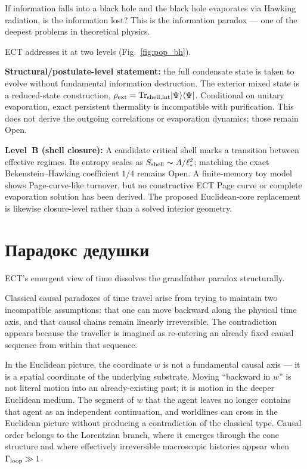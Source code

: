 \documentclass[11pt,a4paper]{article}
\begin{document}
If information falls into a black hole and the black hole evaporates via Hawking radiation, is the information lost? This is the information paradox --- one of the deepest problems in theoretical physics.

ECT addresses it at two levels (Fig.~\ref{fig:pop_bh}).

\textbf{Structural/postulate-level statement:} the full condensate state is taken to evolve without fundamental information destruction. The exterior mixed state is a reduced-state construction, $\rho_{\rm ext}={\rm Tr}_{\rm shell,int}|\Psi\rangle\langle\Psi|$.  Conditional on unitary evaporation, exact persistent thermality is incompatible with purification.  This does not derive the outgoing correlations or evaporation dynamics; those remain Open.

\textbf{Level~B (shell closure):} A candidate critical shell marks a transition between effective regimes.  Its entropy scales as $S_{\rm shell}\sim A/\ell_*^2$; matching the exact Bekenstein--Hawking coefficient $1/4$ remains Open.  A finite-memory toy model shows Page-curve-like turnover, but no constructive ECT Page curve or complete evaporation solution has been derived.  The proposed Euclidean-core replacement is likewise closure-level rather than a solved interior geometry.


\section{Парадокс дедушки}

ECT's emergent view of time dissolves the grandfather paradox structurally.

Classical causal paradoxes of time travel arise from trying to maintain two incompatible assumptions: that one can move backward along the physical time axis, and that causal chains remain linearly irreversible. The contradiction appears because the traveller is imagined as re-entering an already fixed causal sequence from within that sequence.

In the Euclidean picture, the coordinate $w$ is not a fundamental causal axis --- it is a spatial coordinate of the underlying substrate. Moving ``backward in $w$'' is not literal motion into an already-existing past; it is motion in the deeper Euclidean medium. The segment of $w$ that the agent leaves no longer contains that agent as an independent continuation, and worldlines can cross in the Euclidean picture without producing a contradiction of the classical type. Causal order belongs to the Lorentzian branch, where it emerges through the cone structure and where effectively irreversible macroscopic histories appear when $\Gamma_{\rm loop} \gg 1$.
\end{document}
